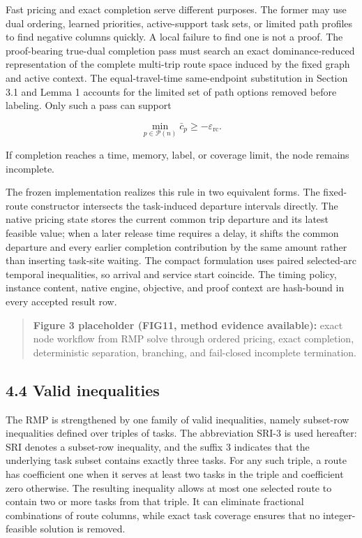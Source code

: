 \documentclass[
  11pt,
]{article}
\begin{document}
Fast pricing and exact completion serve different purposes. The former
may use dual ordering, learned priorities, active-support task sets, or
limited path profiles to find negative columns quickly. A local failure
to find one is not a proof. The proof-bearing true-dual completion pass
must search an exact dominance-reduced representation of the complete
multi-trip route space induced by the fixed graph and active context.
The equal-travel-time same-endpoint substitution in Section 3.1 and
Lemma 1 accounts for the limited set of path options removed before
labeling. Only such a pass can support

\[
\min_{p\in\mathcal{P}(n)}\bar c_p\ge -\varepsilon_{\mathrm{rc}}.
\tag{19}
\]

If completion reaches a time, memory, label, or coverage limit, the node
remains incomplete.

The frozen implementation realizes this rule in two equivalent forms.
The fixed-route constructor intersects the task-induced departure
intervals directly. The native pricing state stores the current common
trip departure and its latest feasible value; when a later release time
requires a delay, it shifts the common departure and every earlier
completion contribution by the same amount rather than inserting
task-site waiting. The compact formulation uses paired selected-arc
temporal inequalities, so arrival and service start coincide. The timing
policy, instance content, native engine, objective, and proof context
are hash-bound in every accepted result row.

\begin{quote}
\textbf{Figure 3 placeholder (FIG11, method evidence available):} exact
node workflow from RMP solve through ordered pricing, exact completion,
deterministic separation, branching, and fail-closed incomplete
termination.
\end{quote}

\hypertarget{valid-inequalities}{%
\subsection{4.4 Valid inequalities}\label{valid-inequalities}}

The RMP is strengthened by one family of valid inequalities, namely
subset-row inequalities defined over triples of tasks. The abbreviation
SRI-3 is used hereafter: SRI denotes a subset-row inequality, and the
suffix 3 indicates that the underlying task subset contains exactly
three tasks. For any such triple, a route has coefficient one when it
serves at least two tasks in the triple and coefficient zero otherwise.
The resulting inequality allows at most one selected route to contain
two or more tasks from that triple. It can eliminate fractional
combinations of route columns, while exact task coverage ensures that no
integer-feasible solution is removed.
\end{document}
